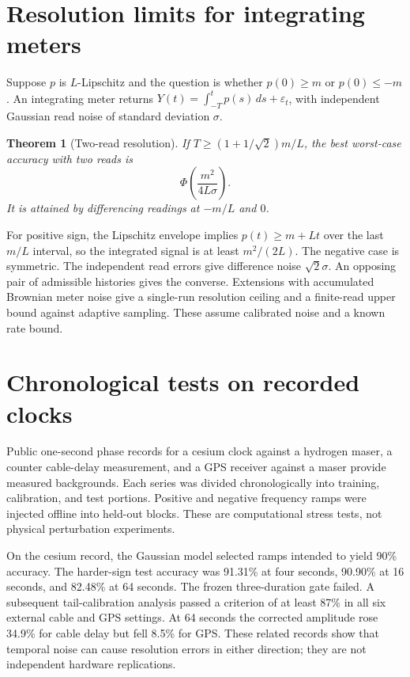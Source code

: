 \documentclass[11pt]{amsart}
\newtheorem{theorem}{Theorem}[section]
\theoremstyle{remark}\newtheorem{remark}[theorem]{Remark}
\begin{document}
\section{Resolution limits for integrating meters}
Suppose $p$ is $L$-Lipschitz and the question is whether $p(0)\ge m$ or $p(0)\le-m$. An integrating meter returns $Y(t)=\int_{-T}^t p(s)\,ds+\varepsilon_t$, with independent Gaussian read noise of standard deviation $\sigma$.

\begin{theorem}[Two-read resolution]
If $T\ge(1+1/\sqrt2)m/L$, the best worst-case accuracy with two reads is
\[
\Phi\!\left(\frac{m^2}{4L\sigma}\right).
\]
It is attained by differencing readings at $-m/L$ and $0$.
\end{theorem}
For positive sign, the Lipschitz envelope implies $p(t)\ge m+Lt$ over the last $m/L$ interval, so the integrated signal is at least $m^2/(2L)$. The negative case is symmetric. The independent read errors give difference noise $\sqrt2\sigma$. An opposing pair of admissible histories gives the converse. Extensions with accumulated Brownian meter noise give a single-run resolution ceiling and a finite-read upper bound against adaptive sampling. These assume calibrated noise and a known rate bound.

\section{Chronological tests on recorded clocks}
Public one-second phase records for a cesium clock against a hydrogen maser, a counter cable-delay measurement, and a GPS receiver against a maser provide measured backgrounds. Each series was divided chronologically into training, calibration, and test portions. Positive and negative frequency ramps were injected offline into held-out blocks. These are computational stress tests, not physical perturbation experiments.

On the cesium record, the Gaussian model selected ramps intended to yield 90\% accuracy. The harder-sign test accuracy was 91.31\% at four seconds, 90.90\% at 16 seconds, and 82.48\% at 64 seconds. The frozen three-duration gate failed. A subsequent tail-calibration analysis passed a criterion of at least 87\% in all six external cable and GPS settings. At 64 seconds the corrected amplitude rose 34.9\% for cable delay but fell 8.5\% for GPS. These related records show that temporal noise can cause resolution errors in either direction; they are not independent hardware replications.
\end{document}
